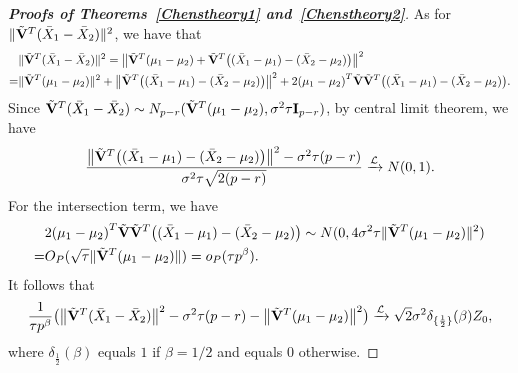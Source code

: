 \documentclass[review]{elsarticle}
\theoremstyle{plain}
\theoremstyle{definition}
\theoremstyle{remark}
\begin{document}
\begin{appendices}
\begin{proof}[\textbf{Proofs of Theorems~\ref{Chenstheory1} and~\ref{Chenstheory2}}]
    As for $\|\tilde{\mathbf{V}}^T(\bar{X}_1-\bar{X}_2)\|^2$, we have that
        $$
        \begin{aligned}
            &\|\tilde{\mathbf{V}}^T(\bar{X}_1-\bar{X}_2)\|^2
            =\big\|\tilde{\mathbf{V}}^T(\mu_1-\mu_2)+\tilde{\mathbf{V}}^T\big((\bar{X}_1-\mu_1)-(\bar{X}_2-\mu_2)\big)\big\|^2\\
            =&\|\tilde{\mathbf{V}}^T(\mu_1-\mu_2)\|^2+
            \big\|\tilde{\mathbf{V}}^T\big((\bar{X}_1-\mu_1)-(\bar{X}_2-\mu_2)\big)\big\|^2+
            2{(\mu_1-\mu_2)}^T\tilde{\mathbf{V}}\tilde{\mathbf{V}}^T\big((\bar{X}_1-\mu_1)-(\bar{X}_2-\mu_2)\big).
        \end{aligned}
        $$
Since $\tilde{\mathbf{V}}^T (\bar{X}_1-\bar{X}_2)\sim N_{p-r}(\tilde{\mathbf{V}}^T (\mu_1-\mu_2),  \sigma^2 \tau \mathbf{I}_{p-r})$, by central limit theorem, we have
    $$
\frac{
    \big\|\tilde{\mathbf{V}}^T\big((\bar{X}_1-\mu_1)-(\bar{X}_2-\mu_2)\big)\big\|^2-\sigma^2 \tau (p-r)}{\sigma^2 \tau\sqrt{2(p-r)}}\xrightarrow{\mathcal{L}} N(0,1).
    $$
    For the intersection term, we have
    \begin{equation*}
        \begin{aligned}
            &2{(\mu_1-\mu_2)}^T\tilde{\mathbf{V}}\tilde{\mathbf{V}}^T\big((\bar{X}_1-\mu_1)-(\bar{X}_2-\mu_2)\big)
            \sim N(0,4\sigma^2 \tau \|\tilde{\mathbf{V}}^T(\mu_1-\mu_2)\|^2)\\
            =& O_P(\sqrt{\tau}\|\tilde{\mathbf{V}}^T(\mu_1-\mu_2)\| )=o_P(\tau p^{\beta}).
        \end{aligned}
    \end{equation*}
    It follows that
    \begin{equation}\label{eq:kkk3}
\frac{1}{\tau p^\beta}
    \big(\big\|\tilde{\mathbf{V}}^T(\bar{X}_1-\bar{X}_2)\big\|^2-\sigma^2 \tau (p-r)-\big\|\tilde{\mathbf{V}}^T(\mu_1-\mu_2)\big\|^2\big)
    \xrightarrow{\mathcal{L}} 
        \sqrt{2}\sigma^2 \delta_{\{\frac{1}{2}\}}(\beta)Z_0,
    \end{equation}
    where $\delta_{\frac{1}{2}}(\beta)$ equals $1$ if $\beta=1/2$ and equals $0$ otherwise.



\end{proof}
\end{appendices}
\end{document}
